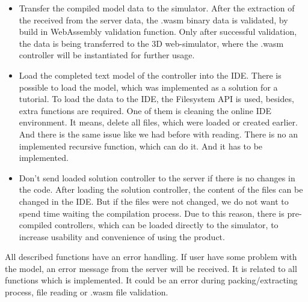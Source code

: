 \begin{itemize}
    \item Transfer the compiled model data to the simulator. After the extraction of the received from the server data, the .wasm binary data is validated, by build in WebAssembly validation function. Only after successful validation, the data is being transferred to the 3D web-simulator, where the .wasm controller will be instantiated for further usage.
    \item Load the completed text model of the controller into the IDE. There is possible to load the model, which was implemented as a solution for a tutorial. To load the data to the IDE, the Filesystem API is used, besides, extra functions are required. One of them is cleaning the online IDE environment. It means, delete all files, which were loaded or created earlier. And there is the same issue like we had before with reading. There is no an implemented recursive function, which can do it. And it has to be implemented.
    \item Don't send loaded solution controller to the server if there is no changes in the code. After loading the solution controller, the content of the files can be changed in the IDE. But if the files were not changed, we do not want to spend time waiting the compilation process. Due to this reason, there is pre-compiled controllers, which can be loaded directly to the simulator, to increase usability and convenience of using the product.
\end{itemize}
All described functions have an error handling. If user have some problem with the model, an error message from the server will be received. It is related to all functions which is implemented. It could be an error during packing/extracting process, file reading or .wasm file validation.
